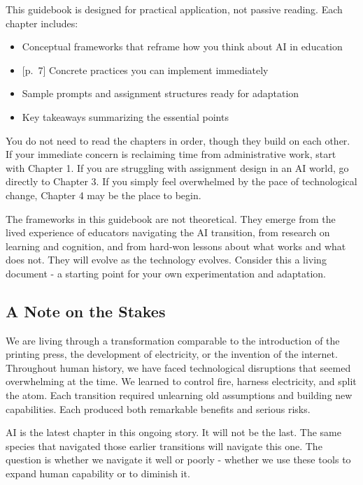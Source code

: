 \documentclass[
  letterpaper,
  DIV=11,
  numbers=noendperiod]{scrreprt}
\providecommand{\tightlist}{%
  \setlength{\itemsep}{0pt}\setlength{\parskip}{0pt}}
\begin{document}
This guidebook is designed for practical application, not passive
reading. Each chapter includes:

\begin{itemize}
\tightlist
\item
  Conceptual frameworks that reframe how you think about AI in education
\item
  {[}p.~7{]} Concrete practices you can implement immediately
\item
  Sample prompts and assignment structures ready for adaptation
\item
  Key takeaways summarizing the essential points
\end{itemize}

You do not need to read the chapters in order, though they build on each
other. If your immediate concern is reclaiming time from administrative
work, start with Chapter 1. If you are struggling with assignment design
in an AI world, go directly to Chapter 3. If you simply feel overwhelmed
by the pace of technological change, Chapter 4 may be the place to
begin.

The frameworks in this guidebook are not theoretical. They emerge from
the lived experience of educators navigating the AI transition, from
research on learning and cognition, and from hard-won lessons about what
works and what does not. They will evolve as the technology evolves.
Consider this a living document - a starting point for your own
experimentation and adaptation.

\subsection{A Note on the Stakes}\label{a-note-on-the-stakes}

We are living through a transformation comparable to the introduction of
the printing press, the development of electricity, or the invention of
the internet. Throughout human history, we have faced technological
disruptions that seemed overwhelming at the time. We learned to control
fire, harness electricity, and split the atom. Each transition required
unlearning old assumptions and building new capabilities. Each produced
both remarkable benefits and serious risks.

AI is the latest chapter in this ongoing story. It will not be the last.
The same species that navigated those earlier transitions will navigate
this one. The question is whether we navigate it well or poorly -
whether we use these tools to expand human capability or to diminish it.
\end{document}
